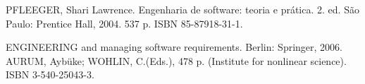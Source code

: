 {{    PFLEEGER, Shari Lawrence. Engenharia de software: teoria e prática. 2. ed. São Paulo: Prentice Hall, 2004. 537 p. ISBN 85-87918-31-1.

    ENGINEERING and managing software requirements. Berlin: Springer, 2006. AURUM, Aybüke; WOHLIN, C.(Eds.), 478 p. (Institute for nonlinear science). ISBN 3-540-25043-3.
    }



}